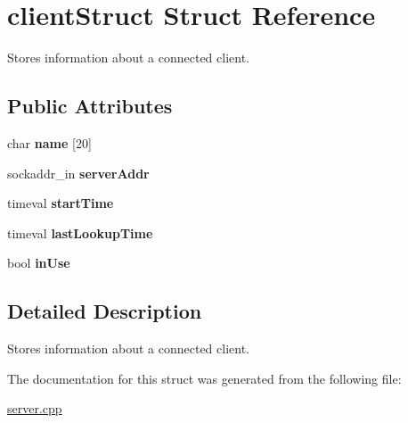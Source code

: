 \hypertarget{structclientStruct}{
\section{clientStruct Struct Reference}
\label{structclientStruct}
}


Stores information about a connected client.  
\subsection*{Public Attributes}
\begin{DoxyCompactItemize}
\item 
\hypertarget{structclientStruct_ac9c7f157aba313b8e60905a3ee4571e0}{
char {\bfseries name} \mbox{[}20\mbox{]}}
\label{structclientStruct_ac9c7f157aba313b8e60905a3ee4571e0}

\item 
\hypertarget{structclientStruct_a5b2c46ac03054a1d34c41808c7d4de53}{
sockaddr\_\-in {\bfseries serverAddr}}
\label{structclientStruct_a5b2c46ac03054a1d34c41808c7d4de53}

\item 
\hypertarget{structclientStruct_ae7ee1557aec07bc9221fce1d77e87f20}{
timeval {\bfseries startTime}}
\label{structclientStruct_ae7ee1557aec07bc9221fce1d77e87f20}

\item 
\hypertarget{structclientStruct_aaf203bf4d5cf8ae2f064caa0d4379f65}{
timeval {\bfseries lastLookupTime}}
\label{structclientStruct_aaf203bf4d5cf8ae2f064caa0d4379f65}

\item 
\hypertarget{structclientStruct_a53a6110aaaa379cdca7b17843fa64af9}{
bool {\bfseries inUse}}
\label{structclientStruct_a53a6110aaaa379cdca7b17843fa64af9}

\end{DoxyCompactItemize}


\subsection{Detailed Description}
Stores information about a connected client. 

The documentation for this struct was generated from the following file:\begin{DoxyCompactItemize}
\item 
\hyperlink{server_8cpp}{server.cpp}\end{DoxyCompactItemize}
